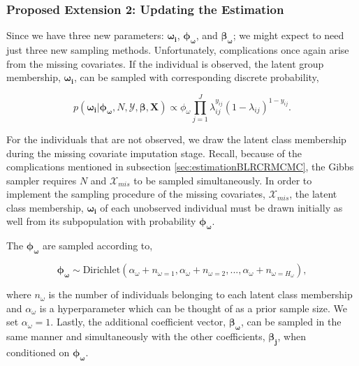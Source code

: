 \documentclass[
  12pt,
]{article}
\begin{document}
\subsubsection{Proposed Extension 2: Updating the Estimation}

Since we have three new parameters: \(\boldsymbol{\omega_i}\),
\(\boldsymbol{\phi_\omega}\), and \(\boldsymbol{\beta_\omega}\); we
might expect to need just three new sampling methods. Unfortunately,
complications once again arise from the missing covariates. If the
individual is observed, the latent group membership,
\(\boldsymbol{\omega_i}\), can be sampled with corresponding discrete
probability,

\begin{equation}
\label{eqn:latentvariableomega}
p(\boldsymbol{\omega_i}|\boldsymbol{\phi_\omega},N,\mathcal{Y},\boldsymbol{\beta},\boldsymbol{X}) \propto \phi_\omega\prod_{j=1}^J\lambda_{ij}^{y_{ij}}(1-\lambda_{ij})^{1-y_{ij}}.
\end{equation}

For the individuals that are not observed, we draw the latent class
membership during the missing covariate imputation stage. Recall,
because of the complications mentioned in subsection
\ref{sec:estimationBLRCRMCMC}, the Gibbs sampler requires \(N\) and
\(\mathcal{X}_{mis}\) to be sampled simultaneously. In order to
implement the sampling procedure of the missing covariates,
\(\mathcal{X}_{mis}\), the latent class membership,
\(\boldsymbol{\omega_i}\) of each unobserved individual must be drawn
initially as well from its subpopulation with probability
\(\boldsymbol{\phi_\omega}\).

The \(\boldsymbol{\phi_\omega}\) are sampled according to,

\begin{equation}
\label{eqn:latentvariablePHIomega}
\boldsymbol{\phi_\omega} \sim \text{Dirichlet}(\alpha_\omega + n_{\omega=1}, \alpha_\omega+n_{\omega=2}, ..., \alpha_\omega+n_{\omega={H_\omega}}),
\end{equation}

where \(n_{\omega}\) is the number of individuals belonging to each
latent class membership and \(\alpha_\omega\) is a hyperparameter which
can be thought of as a prior sample size. We set \(\alpha_\omega=1\).
Lastly, the additional coefficient vector,
\(\boldsymbol{\beta_\omega}\), can be sampled in the same manner and
simultaneously with the other coefficients, \(\boldsymbol{\beta_j}\),
when conditioned on \(\boldsymbol{\phi_\omega}\).
\end{document}
